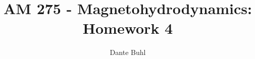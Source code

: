 \documentclass{article}
\begin{document}
\title{AM 275 - Magnetohydrodynamics: Homework 4}
\author{Dante Buhl}


\newcommand{\wrms}{w_{\text{rms}}}
\newcommand{\bs}[1]{\boldsymbol{#1}}
\newcommand{\tb}[1]{\textbf{#1}}
\newcommand{\bmp}[1]{\begin{minipage}{#1\textwidth}}
\newcommand{\emp}{\end{minipage}}
\newcommand{\R}{\mathbb{R}}
\newcommand{\C}{\mathbb{C}}
\newcommand{\N}{\mathcal{N}}
\newcommand{\m}{\bs{\mu}_*}
\newcommand{\s}{\bs{\Sigma}_*}
\newcommand{\dt}{\Delta t}
\newcommand{\dx}{\Delta x}
\newcommand{\tr}[1]{\text{Tr}(#1)}
\newcommand{\Tr}[1]{\text{Tr}(#1)}
\newcommand{\Div}{\nabla \cdot}
\renewcommand{\div}{\nabla \cdot}
\newcommand{\Curl}{\nabla \times}
\newcommand{\Grad}{\nabla}
\newcommand{\grad}{\nabla}
\newcommand{\grads}{\nabla_s}
\newcommand{\gradf}{\nabla_f}
\newcommand{\xs}{x_s}
\newcommand{\x}{\bs{x}}
\newcommand{\xf}{x_f}
\newcommand{\ts}{t_s}
\newcommand{\tf}{t_f}
\newcommand{\pt}{\partial t}
\newcommand{\pz}{\partial z}
\newcommand{\uvec}{\bs{u}}
\newcommand{\bvec}{\bs{B}}
\newcommand{\nvec}{\hat{\bs{n}}}
\newcommand{\B}{\bs{B}}
\newcommand{\A}{\bs{A}}
\newcommand{\jvec}{\bs{j}}
\newcommand{\F}{\bs{F}}
\newcommand{\T}{\tilde{T}}
\newcommand{\ez}{\bs{e}_z}
\newcommand{\ex}{\bs{e}_x}
\newcommand{\ey}{\bs{e}_y}
\newcommand{\eo}{\bs{e}_{\bs{\Omega}}}
\newcommand{\ppt}[1]{\frac{\partial #1}{\partial t}}
\newcommand{\pp}[2]{\frac{\partial #1}{\partial #2}}
\newcommand{\pptwo}[2]{\frac{\partial^2 #1}{\partial #2^2}}
\newcommand{\ddtwo}[2]{\frac{d^2 #1}{d #2^2}}
\newcommand{\DDt}[1]{\frac{D #1}{D t}}
\newcommand{\ppts}[1]{\frac{\partial #1}{\partial t_s}}
\newcommand{\pptf}[1]{\frac{\partial #1}{\partial t_f}}
\newcommand{\ppz}[1]{\frac{\partial #1}{\partial z}}
\newcommand{\ddz}[1]{\frac{d #1}{d z}}
\newcommand{\ppzetas}[1]{\frac{\partial^2 #1}{\partial \zeta^2}}
\newcommand{\ppzs}[1]{\frac{\partial #1}{\partial z_s}}
\newcommand{\ppzf}[1]{\frac{\partial #1}{\partial z_f}}
\newcommand{\ppx}[1]{\frac{\partial #1}{\partial x}}
\newcommand{\ddx}[1]{\frac{d #1}{d x}}
\newcommand{\ppxi}[1]{\frac{\partial #1}{\partial x_i}}
\newcommand{\ppxj}[1]{\frac{\partial #1}{\partial x_j}}
\newcommand{\ppy}[1]{\frac{\partial #1}{\partial y}}
\newcommand{\ppzeta}[1]{\frac{\partial #1}{\partial \zeta}}
\renewcommand{\k}{\bs{k}}
\newcommand{\real}[1]{\text{Re}\left[#1\right]}


\maketitle 
\setlength{\parindent}{0pt}
\end{document}
